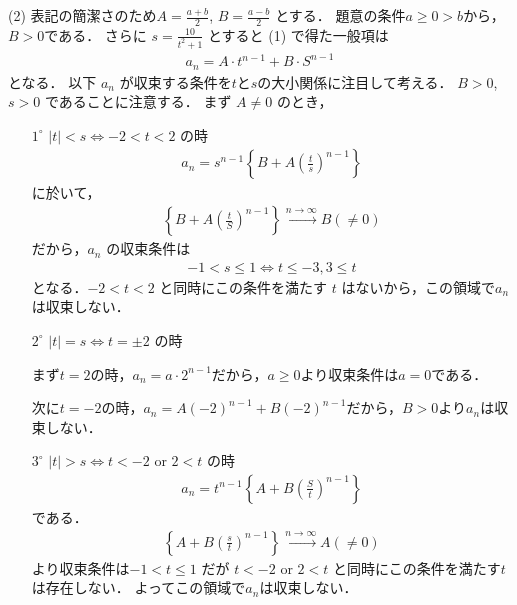 \documentclass[a4paper,10pt]{ltjsarticle}
\begin{document}
\begin{multicols}{2}
  \vspace{10pt}
  (2)
  表記の簡潔さのため$A = \frac{a+b}{2}$, $B = \frac{a-b}{2}$ とする．
  題意の条件$a \ge 0 > b$から，$B>0$である．
  さらに $s = \frac{10}{t^2+1}$ とすると (1) で得た一般項は
  \begin{align*}
    a_n = A \cdot t^{n-1} + B \cdot S^{n-1}
  \end{align*}
  となる．
  以下 $a_n$ が収束する条件を$t$と$s$の大小関係に注目して考える．
  $B>0$, $s>0$ であることに注意する．
  まず $A \ne 0$ のとき，
  \begin{enumerate}
    \item[$1^\circ$] $|t| < s \iff -2 < t < 2$ の時
          \begin{align*}
            a_n = s^{n-1} \left\{ B + A\left(\frac{t}{s}\right)^{n-1} \right\}
          \end{align*}
          に於いて，
          \begin{align*}
            \left\{ B+A\left(\frac{t}{S}\right)^{n-1} \right\} \xrightarrow{n \to \infty} B (\ne 0)
          \end{align*}
          だから，$a_n$ の収束条件は
          \begin{align*}
            -1 < s \le 1 \iff t \le -3, 3 \le t
          \end{align*}
          となる．$-2 < t < 2$ と同時にこの条件を満たす $t$ はないから，この領域で$a_n$は収束しない．
    \item[$2^\circ$] $|t| = s \iff t = \pm 2$ の時

          まず$t=2$の時，$a_n = a \cdot 2^{n-1}$だから，$a\ge 0$より収束条件は$a=0$である．

          次に$t=-2$の時，$a_n = A(-2)^{n-1} + B(-2)^{n-1}$だから，$B>0$より$a_n$は収束しない．
    \item[$3^\circ$] $|t| > s \iff t < -2 \text{ or } 2 < t$ の時
          \begin{align*}
            a_n = t^{n-1} \left\{ A + B\left(\frac{S}{t}\right)^{n-1} \right\}
          \end{align*}
          である．
          \begin{align*}
            \left\{ A+B\left(\frac{s}{t}\right)^{n-1} \right\} \xrightarrow{n \to \infty} A (\ne 0)
          \end{align*}
          より収束条件は$-1 < t \le 1$ だが $t < -2 \text{ or } 2 < t$ と同時にこの条件を満たす$t$は存在しない．
          よってこの領域で$a_n$は収束しない．
  \end{enumerate}


\end{multicols}
\end{document}

